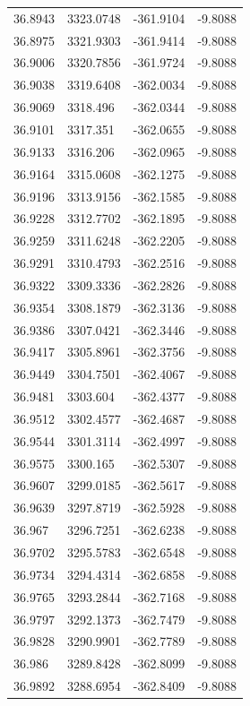\begin{table}[H]
\begin{tabular}{llll}
36.8943 & 3323.0748 & -361.9104 & -9.8088 \\
36.8975 & 3321.9303 & -361.9414 & -9.8088 \\
36.9006 & 3320.7856 & -361.9724 & -9.8088 \\
36.9038 & 3319.6408 & -362.0034 & -9.8088 \\
36.9069 & 3318.496 & -362.0344 & -9.8088 \\
36.9101 & 3317.351 & -362.0655 & -9.8088 \\
36.9133 & 3316.206 & -362.0965 & -9.8088 \\
36.9164 & 3315.0608 & -362.1275 & -9.8088 \\
36.9196 & 3313.9156 & -362.1585 & -9.8088 \\
36.9228 & 3312.7702 & -362.1895 & -9.8088 \\
36.9259 & 3311.6248 & -362.2205 & -9.8088 \\
36.9291 & 3310.4793 & -362.2516 & -9.8088 \\
36.9322 & 3309.3336 & -362.2826 & -9.8088 \\
36.9354 & 3308.1879 & -362.3136 & -9.8088 \\
36.9386 & 3307.0421 & -362.3446 & -9.8088 \\
36.9417 & 3305.8961 & -362.3756 & -9.8088 \\
36.9449 & 3304.7501 & -362.4067 & -9.8088 \\
36.9481 & 3303.604 & -362.4377 & -9.8088 \\
36.9512 & 3302.4577 & -362.4687 & -9.8088 \\
36.9544 & 3301.3114 & -362.4997 & -9.8088 \\
36.9575 & 3300.165 & -362.5307 & -9.8088 \\
36.9607 & 3299.0185 & -362.5617 & -9.8088 \\
36.9639 & 3297.8719 & -362.5928 & -9.8088 \\
36.967 & 3296.7251 & -362.6238 & -9.8088 \\
36.9702 & 3295.5783 & -362.6548 & -9.8088 \\
36.9734 & 3294.4314 & -362.6858 & -9.8088 \\
36.9765 & 3293.2844 & -362.7168 & -9.8088 \\
36.9797 & 3292.1373 & -362.7479 & -9.8088 \\
36.9828 & 3290.9901 & -362.7789 & -9.8088 \\
36.986 & 3289.8428 & -362.8099 & -9.8088 \\
36.9892 & 3288.6954 & -362.8409 & -9.8088 \\

\end{tabular}
\end{table}
